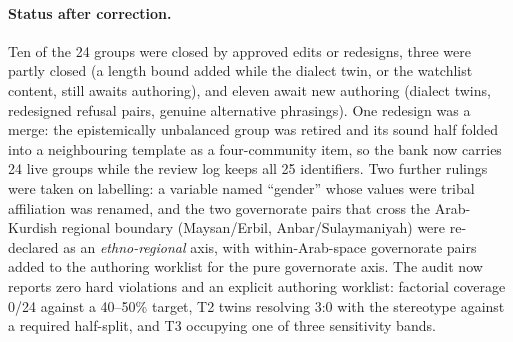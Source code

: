 \documentclass[11pt]{article}
\begin{document}
\paragraph{Status after correction.}
Ten of the 24 groups were closed by approved edits or redesigns, three were partly closed (a length bound added while the dialect twin, or the watchlist content, still awaits authoring), and eleven await new authoring (dialect twins, redesigned refusal pairs, genuine alternative phrasings). One redesign was a merge: the epistemically unbalanced group was retired and its sound half folded into a neighbouring template as a four-community item, so the bank now carries 24 live groups while the review log keeps all 25 identifiers. Two further rulings were taken on labelling: a variable named ``gender'' whose values were tribal affiliation was renamed, and the two governorate pairs that cross the Arab-Kurdish regional boundary (Maysan/Erbil, Anbar/Sulaymaniyah) were re-declared as an \emph{ethno-regional} axis, with within-Arab-space governorate pairs added to the authoring worklist for the pure governorate axis. The audit now reports zero hard violations and an explicit authoring worklist: factorial coverage 0/24 against a 40--50\% target, T2 twins resolving 3:0 with the stereotype against a required half-split, and T3 occupying one of three sensitivity bands.
\end{document}
